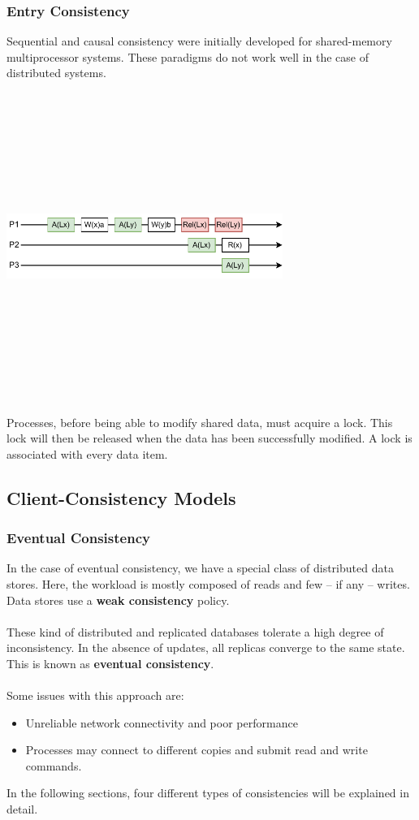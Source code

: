 \documentclass{article}
\begin{document}
\subsubsection{Entry Consistency}
Sequential and causal consistency were initially developed for shared-memory multiprocessor systems. These paradigms do not work well in the case of distributed systems. 
\begin{center}
	\includegraphics[width=9cm, height=10cm, keepaspectratio]{assets/entry-consistency.pdf}
\end{center}
Processes, before being able to modify shared data, must acquire a lock. This lock will then be released when the data has been successfully modified. A lock is associated with every data item.

\subsection{Client-Consistency Models}
\subsubsection{Eventual Consistency}
In the case of eventual consistency, we have a special class of distributed data stores. Here, the workload is mostly composed of reads and few -- if any -- writes. Data stores use a \textbf{weak consistency} policy. \\ \\
These kind of distributed and replicated databases tolerate a high degree of inconsistency. In the absence of updates, all replicas converge to the same state. This is known as \textbf{eventual consistency}. \\ \\
Some issues with this approach are:
\begin{itemize}
	\item Unreliable network connectivity and poor performance
	\item Processes may connect to different copies and submit read and write commands.
\end{itemize}
In the following sections, four different types of consistencies will be explained in detail.
\end{document}
